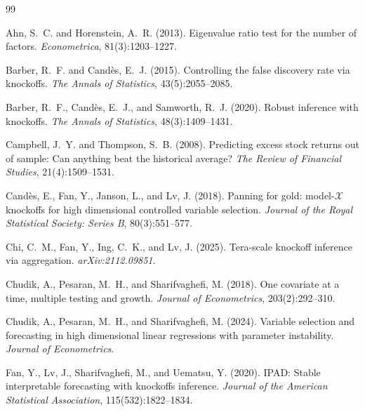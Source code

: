 \documentclass[12pt, a4paper]{article}
\begin{document}
\begin{thebibliography}{99}

Ahn, S.~C. and Horenstein, A.~R. (2013).
\newblock Eigenvalue ratio test for the number of factors.
\newblock \emph{Econometrica}, 81(3):1203--1227.

Barber, R.~F. and Cand\`{e}s, E.~J. (2015).
\newblock Controlling the false discovery rate via knockoffs.
\newblock \emph{The Annals of Statistics}, 43(5):2055--2085.

Barber, R.~F., Cand\`{e}s, E.~J., and Samworth, R.~J. (2020).
\newblock Robust inference with knockoffs.
\newblock \emph{The Annals of Statistics}, 48(3):1409--1431.

Campbell, J.~Y. and Thompson, S.~B. (2008).
\newblock Predicting excess stock returns out of sample: Can anything beat the historical average?
\newblock \emph{The Review of Financial Studies}, 21(4):1509--1531.

Cand\`{e}s, E., Fan, Y., Janson, L., and Lv, J. (2018).
\newblock Panning for gold: model-$\mathcal{X}$ knockoffs for high dimensional controlled variable selection.
\newblock \emph{Journal of the Royal Statistical Society: Series B}, 80(3):551--577.

Chi, C.~M., Fan, Y., Ing, C.~K., and Lv, J. (2025).
\newblock Tera-scale knockoff inference via aggregation.
\newblock \emph{arXiv:2112.09851}.

Chudik, A., Pesaran, M.~H., and Sharifvaghefi, M. (2018).
\newblock One covariate at a time, multiple testing and growth.
\newblock \emph{Journal of Econometrics}, 203(2):292--310.

Chudik, A., Pesaran, M.~H., and Sharifvaghefi, M. (2024).
\newblock Variable selection and forecasting in high dimensional linear regressions with parameter instability.
\newblock \emph{Journal of Econometrics}.

Fan, Y., Lv, J., Sharifvaghefi, M., and Uematsu, Y. (2020).
\newblock IPAD: Stable interpretable forecasting with knockoffs inference.
\newblock \emph{Journal of the American Statistical Association}, 115(532):1822--1834.


\end{thebibliography}
\end{document}
